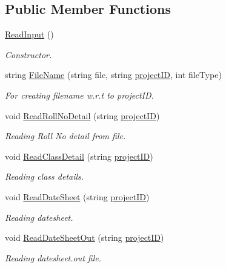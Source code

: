 \subsection*{\-Public \-Member \-Functions}
\begin{DoxyCompactItemize}
\item 
\hyperlink{classReadInput_a181da3d718520ea9168808dde2d3e867}{\-Read\-Input} ()
\begin{DoxyCompactList}\small\item\em \-Constructor. \end{DoxyCompactList}\item 
string \hyperlink{classReadInput_a990ac303132881774253593565e85bd0}{\-File\-Name} (string file, string \hyperlink{classReadInput_a3ad470a25b3e0a29466bf4ff1f7d8e81}{project\-I\-D}, int file\-Type)
\begin{DoxyCompactList}\small\item\em \-For creating filename w.\-r.\-t to project\-I\-D. \end{DoxyCompactList}\item 
void \hyperlink{classReadInput_a6a901973196e63579e4452fede5ce01e}{\-Read\-Roll\-No\-Detail} (string \hyperlink{classReadInput_a3ad470a25b3e0a29466bf4ff1f7d8e81}{project\-I\-D})
\begin{DoxyCompactList}\small\item\em \-Reading \-Roll \-No detail from file. \end{DoxyCompactList}\item 
void \hyperlink{classReadInput_aff1e359dc8b72c710bb15647ff4e78da}{\-Read\-Class\-Detail} (string \hyperlink{classReadInput_a3ad470a25b3e0a29466bf4ff1f7d8e81}{project\-I\-D})
\begin{DoxyCompactList}\small\item\em \-Reading class details. \end{DoxyCompactList}\item 
void \hyperlink{classReadInput_a582c57e19fd218bfdc8b83d6e8599ea2}{\-Read\-Date\-Sheet} (string \hyperlink{classReadInput_a3ad470a25b3e0a29466bf4ff1f7d8e81}{project\-I\-D})
\begin{DoxyCompactList}\small\item\em \-Reading datesheet. \end{DoxyCompactList}\item 
void \hyperlink{classReadInput_aa8c2bc34575b32291e05bc00515530e5}{\-Read\-Date\-Sheet\-Out} (string \hyperlink{classReadInput_a3ad470a25b3e0a29466bf4ff1f7d8e81}{project\-I\-D})
\begin{DoxyCompactList}\small\item\em \-Reading datesheet.\-out file. \end{DoxyCompactList}\item 

\end{DoxyCompactItemize}
